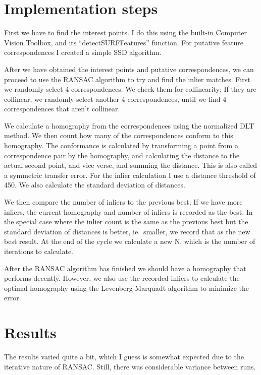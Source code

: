 \section{Implementation steps}

First we have to find the interest points. I do this using the built-in
Computer Vision Toolbox, and its ``detectSURFFeatures'' function.
For putative feature correspondences I created a simple SSD algorithm.

After we have obtained the interest points and putative correspondences, we can
proceed to use the RANSAC algorithm to try and find the inlier matches. 
First we randomly select 4 correspondences. We check them for collinearity; If
they are collinear, we randomly select another 4 correspondences, until we find
4 correspondences that aren't collinear.

We calculate a homography from the correspondences using the normalized DLT
method. We then count how many of the correspondences conform to this
homography. The conformance is calculated by transforming a point from a
correspondence pair by the homography, and calculating the distance to the
actual second point, and vice verse, and summing the distance. This is also
called a symmetric transfer error. For the inlier calculation I use a distance threshold
of 450. We also calculate the standard deviation of distances.

We then compare the number of inliers to the previous best; If we have more
inliers, the current homography and number of inliers is recorded as the best.
In the special case where the inlier count is the same as the previous best but
the standard deviation of distances is better, ie.\ smaller, we record that as
the new best result. At the end of the cycle we calculate a new N, which is the
number of iterations to calculate.

After the RANSAC algorithm has finished we should have a homography that
performs decently. However, we also use the recorded inliers to calculate the
optimal homography using the Levenberg-Marquadt algorithm to minimize the
error.


\section{Results}

The results varied quite a bit, which I guess is somewhat expected due to the
iterative nature of RANSAC\@. Still, there was considerable variance between
runs.

